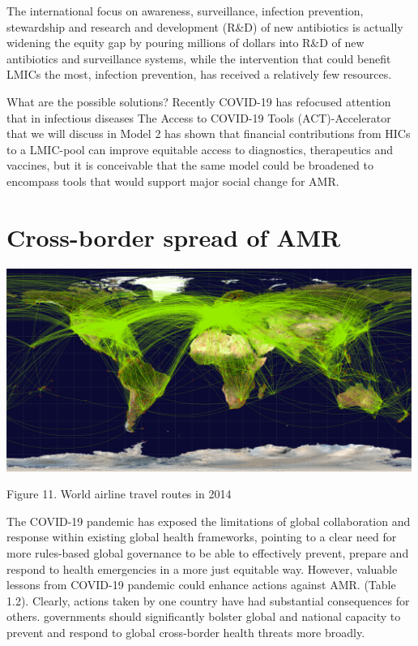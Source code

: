 \documentclass[
]{book}
\begin{document}
The international focus on awareness, surveillance, infection prevention, stewardship and research and development (R\&D) of new antibiotics is actually widening the equity gap by pouring millions of dollars into R\&D of new antibiotics and surveillance systems, while the intervention that could benefit LMICs the most, infection prevention, has received a relatively few resources.

What are the possible solutions? Recently COVID-19 has refocused attention that in infectious diseases The Access to COVID-19 Tools (ACT)-Accelerator that we will discuss in Model 2 has shown that financial contributions from HICs to a LMIC-pool can improve equitable access to diagnostics, therapeutics and vaccines, but it is conceivable that the same model could be broadened to encompass tools that would support major social change for AMR.

\hypertarget{cross-border-spread-of-amr}{%
\section*{Cross-border spread of AMR}\label{cross-border-spread-of-amr}}

\includegraphics[width=5.20833in,height=\textheight]{images/worldairlineroute2014.png}

Figure 11. World airline travel routes in 2014

The COVID-19 pandemic has exposed the limitations of global collaboration and response within existing global health frameworks, pointing to a clear need for more rules-based global governance to be able to effectively prevent, prepare and respond to health emergencies in a more just equitable way. However, valuable lessons from COVID-19 pandemic could enhance actions against AMR. (Table 1.2). Clearly, actions taken by one country have had substantial consequences for others. governments should significantly bolster global and national capacity to prevent and respond to global cross-border health threats more broadly.
\end{document}
